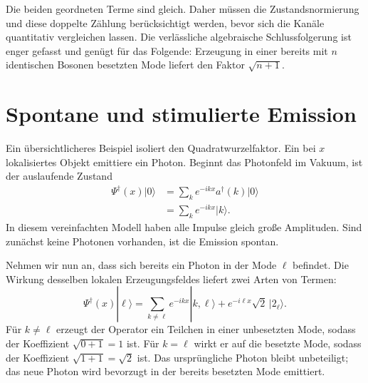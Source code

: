 Die beiden geordneten Terme sind gleich. Daher müssen die Zustandsnormierung und diese doppelte Zählung berücksichtigt werden, bevor sich die Kanäle quantitativ vergleichen lassen. Die verlässliche algebraische Schlussfolgerung ist enger gefasst und genügt für das Folgende: Erzeugung in einer bereits mit \(n\) identischen Bosonen besetzten Mode liefert den Faktor \(\sqrt{n+1}\).

\section{Spontane und stimulierte Emission}

Ein übersichtlicheres Beispiel isoliert den Quadratwurzelfaktor. Ein bei \(x\) lokalisiertes Objekt emittiere ein Photon. Beginnt das Photonfeld im Vakuum, ist der auslaufende Zustand
\begin{align}
\Psi^\dagger(x)|0\rangle
&=\sum_k e^{-ikx}a^\dagger(k)|0\rangle\\
&=\sum_k e^{-ikx}|k\rangle.
\end{align}
In diesem vereinfachten Modell haben alle Impulse gleich große Amplituden. Sind zunächst keine Photonen vorhanden, ist die Emission spontan.

Nehmen wir nun an, dass sich bereits ein Photon in der Mode \(\ell\) befindet. Die Wirkung desselben lokalen Erzeugungsfeldes liefert zwei Arten von Termen:
\begin{equation}
\Psi^\dagger(x)|\ell\rangle
=
\sum_{k\ne\ell}e^{-ikx}|k,\ell\rangle
+e^{-i\ell x}\sqrt{2}\,|2_\ell\rangle.
\end{equation}
Für \(k\ne\ell\) erzeugt der Operator ein Teilchen in einer unbesetzten Mode, sodass der Koeffizient \(\sqrt{0+1}=1\) ist. Für \(k=\ell\) wirkt er auf die besetzte Mode, sodass der Koeffizient \(\sqrt{1+1}=\sqrt{2}\) ist. Das ursprüngliche Photon bleibt unbeteiligt; das neue Photon wird bevorzugt in der bereits besetzten Mode emittiert.

\begin{classroomqa}
\end{classroomqa}

